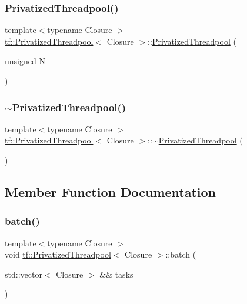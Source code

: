 \subsubsection{\texorpdfstring{Privatized\+Threadpool()}{PrivatizedThreadpool()}}
{\footnotesize\ttfamily template$<$typename Closure $>$ \\
\hyperlink{classtf_1_1PrivatizedThreadpool}{tf\+::\+Privatized\+Threadpool}$<$ Closure $>$\+::\hyperlink{classtf_1_1PrivatizedThreadpool}{Privatized\+Threadpool} (\begin{DoxyParamCaption}\item[{unsigned}]{N }\end{DoxyParamCaption})}

\mbox{\label{classtf_1_1PrivatizedThreadpool_a021f35dd73c6b2fb0c8d427509e60cc0}} 
\subsubsection{\texorpdfstring{$\sim$\+Privatized\+Threadpool()}{~PrivatizedThreadpool()}}
{\footnotesize\ttfamily template$<$typename Closure $>$ \\
\hyperlink{classtf_1_1PrivatizedThreadpool}{tf\+::\+Privatized\+Threadpool}$<$ Closure $>$\+::$\sim$\hyperlink{classtf_1_1PrivatizedThreadpool}{Privatized\+Threadpool} (\begin{DoxyParamCaption}{ }\end{DoxyParamCaption})}



\subsection{Member Function Documentation}
\mbox{\label{classtf_1_1PrivatizedThreadpool_a4505c9609edcd794c99acca1b4a23abc}} 
\subsubsection{\texorpdfstring{batch()}{batch()}}
{\footnotesize\ttfamily template$<$typename Closure $>$ \\
void \hyperlink{classtf_1_1PrivatizedThreadpool}{tf\+::\+Privatized\+Threadpool}$<$ Closure $>$\+::batch (\begin{DoxyParamCaption}\item[{std\+::vector$<$ Closure $>$ \&\&}]{tasks }\end{DoxyParamCaption})}

